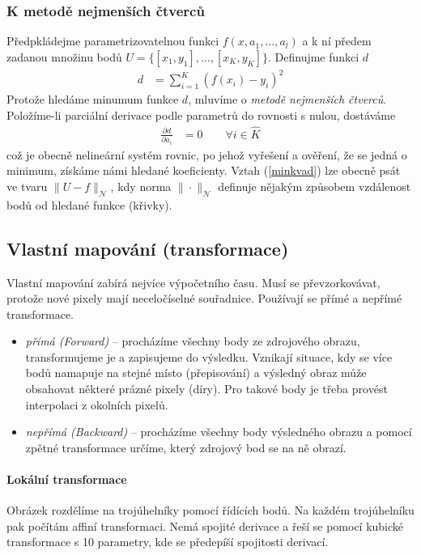 \subsubsection{K metodě nejmenších čtverců}
Předpkládejme parametrizovatelnou funkci $f(x,a_1,\dots,a_l)$ a k ní předem zadanou množinu bodů $U=\{[x_1,y_1],\dots,[x_K,y_K]\}$. Definujme funkci $d$ 
\begin{align}
d &= \sum\limits_{i=1}^K (f(x_i)-y_i)^2\label{minkvad}
\end{align}
Protože hledáme minumum funkce $d$, mluvíme o \emph{metodě nejmenších čtverců}. Položíme-li parciální derivace podle parametrů do rovnosti s nulou, dostáváme
\begin{align}
\frac{\partial d}{\partial a_i} &= 0\qquad\forall i\in \hat{K}
\end{align}
což je obecně nelineární systém rovnic, po jehož vyřešení a ověření, že se jedná o minimum, získáme námi hledané koeficienty. Vztah (\ref{minkvad}) lze obecně psát ve tvaru $\|U-f\|_\mathcal{N}$, kdy norma $\|\cdot\|_\mathcal{N}$ definuje nějakým způsobem vzdálenost bodů od hledané funkce (křivky).


\subsection{Vlastní mapování (transformace)}
Vlastní mapování zabírá nejvíce výpočetního času. Musí se převzorkovávat, protože nové pixely mají neceločíselné souřadnice. Používají se přímé a nepřímé transformace.

\begin{itemize}
\item \emph{přímá (Forward)} -- procházíme všechny body ze zdrojového obrazu, transformujeme je a zapisujeme do výsledku. 
Vznikají situace, kdy se více bodů namapuje na stejné místo (přepisování) a výsledný obraz může obsahovat některé
prázné pixely (díry). Pro takové body je třeba provést interpolaci z okolních pixelů.

\item \emph{nepřímá (Backward)} -- procházíme všechny body výsledného obrazu a pomocí zpětné transformace určíme, který zdrojový bod
se na ně obrazí.
\end{itemize}

\paragraph{Lokální transformace}
Obrázek rozdělíme na trojúhelníky pomocí řídících bodů. Na každém trojúhelníku pak počítám affiní transformaci. Nemá spojité derivace a řeší se pomocí kubické transformace s 10 parametry, kde se předepíší spojitosti derivací.

